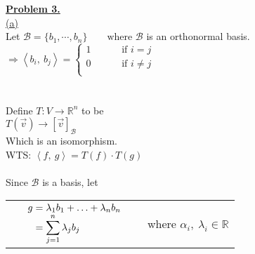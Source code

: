 \documentclass[12pt]{article}
\newcommand{\R}{\mathbb{R}}
\newcommand{\innerproduct}[2]{\left\langle #1, \ #2\right\rangle}
\begin{document}
\newpage
{\LARGE \noindent \underline{\textbf{Problem 3.}}}\\

\hyperlink{toc}{\hypertarget{3.1}{(a)}}\\
Let $\mathcal{B} = \{b_1, \cdots, b_n\} \qquad \text{where }\mathcal{B}$ is an orthonormal basis.\\
$\Longrightarrow \innerproduct{b_i}{b_j} = \left\{
	\begin{aligned}
		1 \qquad & \text{ if } i = j      \\
		0 \qquad & \text{ if } i \not = j \\
	\end{aligned}
	\right.$
\\\\\\
Define $T: V \rightarrow \R^n $ to be\\
$T(\vec{v}) \rightarrow [\vec{v}]_\mathcal{B}$\\
Which is an isomorphism.\\
WTS: $\innerproduct{f}{g} = T(f)\cdot T(g)$
\\\\
Since $\mathcal{B}$ is a basis, let \\
\begin{tabularx}{\textwidth}{>{\centering\arraybackslash}X >{\centering\arraybackslash}X >{\centering\arraybackslash}X}
	{\setstretch{1.5}$\begin{array}{r@{}>{\displaystyle}ll}
				f & {}=\alpha_1b_1 + \ldots + \alpha_nb_n & \text{} \\
				  & {}= \sum_{i = 1}^{n}\alpha_ib_i       & \text{} \\
			\end{array}$} &
	{\setstretch{1.5}$\begin{array}{r@{}>{\displaystyle}ll}
					g & {}=\lambda_1b_1 + \ldots + \lambda_nb_n & \text{} \\
					  & {}=\sum_{j = 1}^{n}\lambda_jb_j         & \text{} \\
				\end{array}$} & where $\alpha_i, \ \lambda_i \in \R $
\end{tabularx}
\\\\\\
\end{document}
